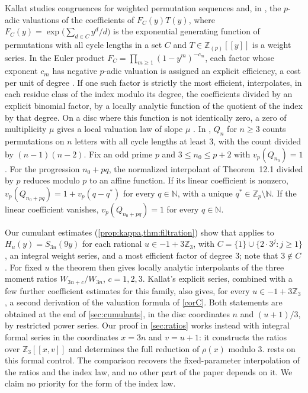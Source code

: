 \documentclass[11pt,reqno]{amsart}
\theoremstyle{definition}
\theoremstyle{remark}
\theoremstyle{plain}
\newcommand{\Z}{\mathbb Z}
\newcommand{\N}{\mathbb N}
\begin{document}
Kallat studies congruences for weighted permutation sequences \cite{Kallat2026b} and, in \cite{Kallat2026a}, the $p$-adic valuations of the coefficients of $F_C(y)T(y)$, where $F_C(y)=\exp\bigl(\sum_{d\in C}y^d/d\bigr)$ is the exponential generating function of permutations with all cycle lengths in a set $C$ and $T\in\mathbb Z_{(p)}[[y]]$ is a weight series. In the Euler product $F_C=\prod_{m\ge1}(1-y^m)^{-c_m}$, each factor whose exponent $c_m$ has negative $p$-adic valuation is assigned an explicit efficiency, a cost per unit of degree \cite[\S\S8.1, 8.8]{Kallat2026a}. If one such factor is strictly the most efficient, \cite[Thm.~12.1]{Kallat2026a} interpolates, in each residue class of the index modulo its degree, the coefficients divided by an explicit binomial factor, by a locally analytic function of the quotient of the index by that degree. On a disc where this function is not identically zero, a zero of multiplicity $\mu$ gives a local valuation law of slope $\mu$ \cite[Cor.~12.2]{Kallat2026a}. In \cite[Thm.~12.4]{Kallat2026a}, $Q_n$ for $n\ge3$ counts permutations on $n$ letters with all cycle lengths at least $3$, with the count divided by $(n-1)(n-2)$. Fix an odd prime $p$ and $3\le n_0\le p+2$ with $v_p(Q_{n_0})=1$. For the progression $n_0+pq$, the normalized interpolant of Theorem~12.1 divided by $p$ reduces modulo $p$ to an affine function. If its linear coefficient is nonzero, $v_p(Q_{n_0+pq})=1+v_p(q-q^\ast)$ for every $q\in\N$, with a unique $q^\ast\in\Z_p\setminus\N$. If the linear coefficient vanishes, $v_p(Q_{n_0+pq})=1$ for every $q\in\N$.

Our cumulant estimates (\cref{prop:kappa,thm:filtration}) show that \cite[Thm.~12.1]{Kallat2026a} applies to $H_u(y)=S_{3u}(9y)$ for each rational $u\in-1+3\Z_3$, with $C=\{1\}\cup\{2\cdot3^j:j\ge1\}$, an integral weight series, and a most efficient factor of degree $3$; note that $3\notin C$. For fixed $u$ the theorem then gives locally analytic interpolants of the three moment ratios $W_{3n+c}/W_{3n}$, $c=1,2,3$. Kallat's explicit series, combined with a few further coefficient estimates for this family, also gives, for every $u\in-1+3\Z_3$, a second derivation of the valuation formula of \cref{corC}. Both statements are obtained at the end of \cref{sec:cumulants}, in the disc coordinates $n$ and $(u+1)/3$, by restricted power series. Our proof in \cref{sec:ratios} works instead with integral formal series in the coordinates $x=3n$ and $v=u+1$: it constructs the ratios over $\Z_3[[x,v]]$ and determines the full reduction of $\rho(x)$ modulo $3$.  rests on this formal control. The comparison recovers the fixed-parameter interpolation of the ratios and the index law, and no other part of the paper depends on it. We claim no priority for the form of the index law.
\end{document}
